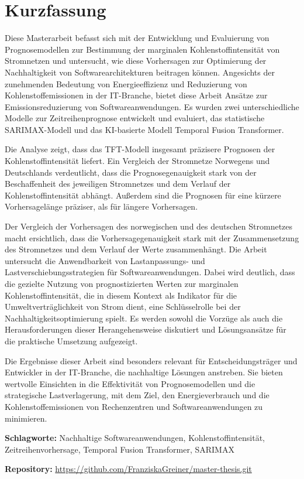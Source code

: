 \chapter*{Kurzfassung}
\thispagestyle{empty}
\noindent Diese Masterarbeit befasst sich mit der Entwicklung und Evaluierung von Prognosemodellen zur Bestimmung der marginalen Kohlenstoffintensität von Stromnetzen und untersucht, wie diese Vorhersagen zur Optimierung der Nachhaltigkeit von Softwarearchitekturen beitragen können.
Angesichts der zunehmenden Bedeutung von Energieeffizienz und Reduzierung von Kohlenstoffemissionen in der IT-Branche, bietet diese Arbeit Ansätze zur Emissionsreduzierung von Softwareanwendungen.
Es wurden zwei unterschiedliche Modelle zur Zeitreihenprognose entwickelt und evaluiert, das statistische SARIMAX-Modell und das KI-basierte Modell Temporal Fusion Transformer.

Die Analyse zeigt, dass das TFT-Modell insgesamt präzisere Prognosen der Kohlenstoffintensität liefert.
Ein Vergleich der Stromnetze Norwegens und Deutschlands verdeutlicht, dass die Prognosegenauigkeit stark von der Beschaffenheit des jeweiligen Stromnetzes und dem Verlauf der Kohlenstoffintensität abhängt.
Außerdem sind die Prognosen für eine kürzere Vorhersagelänge präziser, als für längere Vorhersagen.

Der Vergleich der Vorhersagen des norwegischen und des deutschen Stromnetzes macht ersichtlich, dass die Vorhersagegenauigkeit stark mit der Zusammensetzung des Stromnetzes und dem Verlauf der Werte zusammenhängt.
Die Arbeit untersucht die Anwendbarkeit von Lastanpassungs- und Lastverschiebungsstrategien für Softwareanwendungen.
Dabei wird deutlich, dass die gezielte Nutzung von prognostizierten Werten zur marginalen Kohlenstoffintensität, die in diesem Kontext als Indikator für die Umweltverträglichkeit von Strom dient, eine Schlüsselrolle bei der Nachhaltigkeitsoptimierung spielt.
Es werden sowohl die Vorzüge als auch die Herausforderungen dieser Herangehensweise diskutiert und Lösungsansätze für die praktische Umsetzung aufgezeigt.

Die Ergebnisse dieser Arbeit sind besonders relevant für Entscheidungsträger und Entwickler in der IT-Branche, die nachhaltige Lösungen anstreben.
Sie bieten wertvolle Einsichten in die Effektivität von Prognosemodellen und die strategische Lastverlagerung, mit dem Ziel, den Energieverbrauch und die Kohlenstoffemissionen von Rechenzentren und Softwareanwendungen zu minimieren.

\bigskip

\noindent
\textbf{Schlagworte:} Nachhaltige Softwareanwendungen, Kohlenstoffintensität, Zeitreihenvorhersage, Temporal Fusion Transformer, SARIMAX

\bigskip
\noindent
\textbf{Repository:}
\url{https://github.com/FranziskaGreiner/master-thesis.git}

